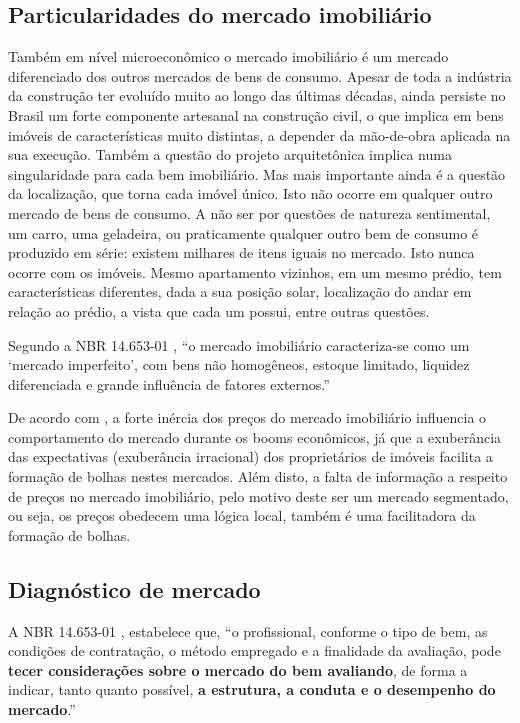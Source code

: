 \documentclass[
	12pt,				%
	oneside,			%
	a4paper,			%
	chapter=TITLE,		%
	section=TITLE,		%
	english,			%
	brazil				%
	]{abntex2}
\begin{document}
\subsection{Particularidades do mercado
imobiliário}\label{particularidades-do-mercado-imobiliuxe1rio}

Também em nível microeconômico o mercado imobiliário é um mercado
diferenciado dos outros mercados de bens de consumo. Apesar de toda a
indústria da construção ter evoluído muito ao longo das últimas décadas,
ainda persiste no Brasil um forte componente artesanal na construção
civil, o que implica em bens imóveis de características muito distintas,
a depender da mão-de-obra aplicada na sua execução. Também a questão do
projeto arquitetônica implica numa singularidade para cada bem
imobiliário. Mas mais importante ainda é a questão da localização, que
torna cada imóvel único. Isto não ocorre em qualquer outro mercado de
bens de consumo. A não ser por questões de natureza sentimental, um
carro, uma geladeira, ou praticamente qualquer outro bem de consumo é
produzido em série: existem milhares de itens iguais no mercado. Isto
nunca ocorre com os imóveis. Mesmo apartamento vizinhos, em um mesmo
prédio, tem características diferentes, dada a sua posição solar,
localização do andar em relação ao prédio, a vista que cada um possui,
entre outras questões.

Segundo a NBR 14.653-01 \autocite*[x]{NBR1465301}, ``o mercado
imobiliário caracteriza-se como um `mercado imperfeito', com bens não
homogêneos, estoque limitado, liquidez diferenciada e grande influência
de fatores externos.''

De acordo com \textcites{ADAMS201038}[3]{ADAMS201038}, a forte inércia
dos preços do mercado imobiliário influencia o comportamento do mercado
durante os booms econômicos, já que a exuberância das expectativas
(exuberância irracional) dos proprietários de imóveis facilita a
formação de bolhas nestes mercados. Além disto, a falta de informação a
respeito de preços no mercado imobiliário, pelo motivo deste ser um
mercado segmentado, ou seja, os preços obedecem uma lógica local, também
é uma facilitadora da formação de bolhas.

\subsection{Diagnóstico de mercado}\label{diagnuxf3stico-de-mercado}

A NBR 14.653-01 \autocite*[12]{NBR1465301}, estabelece que, ``o
profissional, conforme o tipo de bem, as condições de contratação, o
método empregado e a finalidade da avaliação, pode \textbf{tecer
considerações sobre o mercado do bem avaliando}, de forma a indicar,
tanto quanto possível, \textbf{a estrutura, a conduta e o desempenho do
mercado}.''
\end{document}
